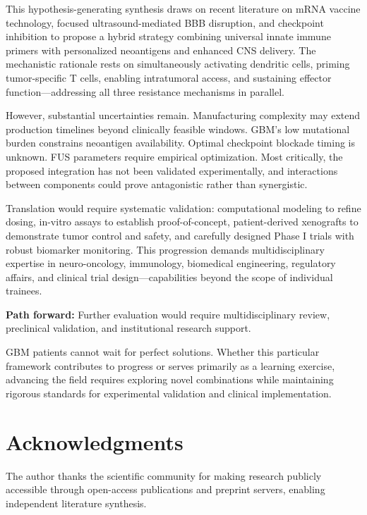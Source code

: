 \documentclass[12pt]{article}
\begin{document}
This hypothesis-generating synthesis draws on recent literature on mRNA vaccine technology, focused ultrasound-mediated BBB disruption, and checkpoint inhibition to propose a hybrid strategy combining universal innate immune primers with personalized neoantigens and enhanced CNS delivery. The mechanistic rationale rests on simultaneously activating dendritic cells, priming tumor-specific T cells, enabling intratumoral access, and sustaining effector function—addressing all three resistance mechanisms in parallel.

However, substantial uncertainties remain. Manufacturing complexity may extend production timelines beyond clinically feasible windows. GBM's low mutational burden constrains neoantigen availability. Optimal checkpoint blockade timing is unknown. FUS parameters require empirical optimization. Most critically, the proposed integration has not been validated experimentally, and interactions between components could prove antagonistic rather than synergistic.

Translation would require systematic validation: computational modeling to refine dosing, in-vitro assays to establish proof-of-concept, patient-derived xenografts to demonstrate tumor control and safety, and carefully designed Phase I trials with robust biomarker monitoring. This progression demands multidisciplinary expertise in neuro-oncology, immunology, biomedical engineering, regulatory affairs, and clinical trial design—capabilities beyond the scope of individual trainees.

\textbf{Path forward:} Further evaluation would require multidisciplinary review, preclinical validation, and institutional research support.

GBM patients cannot wait for perfect solutions. Whether this particular framework contributes to progress or serves primarily as a learning exercise, advancing the field requires exploring novel combinations while maintaining rigorous standards for experimental validation and clinical implementation.

\section*{Acknowledgments}

The author thanks the scientific community for making research publicly accessible through open-access publications and preprint servers, enabling independent literature synthesis.
\end{document}
